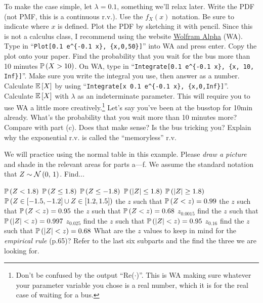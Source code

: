 \documentclass[12pt]{article}
\begin{document}
\benum
\easysubproblem To make the case simple, let $\lambda = 0.1$, something we'll relax later. Write the PDF (not PMF, this is a continuous r.v.). Use the $f_X(x)$ notation. Be sure to indicate where $x$ is defined.
\easysubproblem Plot the PDF by sketching it with pencil. Since this is not a calculus class, I recommend using the website \href{http://www.wolframalpha.com}{Wolfram Alpha} (WA). Type in ``\texttt{Plot[0.1 e\textasciicircum\{-0.1 x\}, \{x,0,50\}]}'' into WA and press enter. Copy the plot onto your paper.
\easysubproblem Find the probability that you wait for the bus more than 10 minutes \ie $\mathbb{P}\left(X>10\right)$. On WA, type in ``\texttt{Integrate[0.1 e\textasciicircum\{-0.1 x\}, \{x, 10, Inf\}]}''. Make sure you write the integral you use, then answer as a number.
\easysubproblem Calculate $\mathbb{E}\left[X\right]$ by using ``\texttt{Integrate[x 0.1 e\textasciicircum\{-0.1 x\}, \{x,0,Inf\}]}''.
\intermediatesubproblem Calculate $\mathbb{E}\left[X\right]$ with $\lambda$ as an indeterminate parameter. This will require you to use WA a little more creatively.\footnote{Don't be confused by the output ``Re($\cdot$)''. This is WA making sure whatever your parameter variable you chose is a real number, which it is for the real case of waiting for a bus.}
\extracreditsubproblem Let's say you've been at the busstop for 10min already. What's the probability that you wait more than 10 minutes more? Compare with part (c). Does that make sense? Is the bus tricking you? Explain why the exponential r.v. is called the ``memoryless'' r.v.
\eenum

\problem We will practice using the normal table in this example. Please \textit{draw a picture} and shade in the relevant areas for parts a---f. We assume the standard notation that $Z \sim \mathcal{N}\left(0,\,1\right)$. Find...

\benum
\easysubproblem $\mathbb{P}\left(Z < 1.8\right)$
\easysubproblem $\mathbb{P}\left(Z \leq 1.8\right)$
\easysubproblem $\mathbb{P}\left(Z \leq -1.8\right)$
\easysubproblem $\mathbb{P}\left(|Z| \leq 1.8\right)$
\easysubproblem $\mathbb{P}\left(|Z| \geq 1.8\right)$
\hardsubproblem $\mathbb{P}\left(Z \in [-1.5, -1.2] \cup Z \in [1.2,1.5]\right)$
\easysubproblem the $z$ such that $\mathbb{P}\left(Z < z\right) = 0.99$
\easysubproblem the $z$ such that $\mathbb{P}\left(Z < z\right) = 0.95$
\easysubproblem the $z$ such that $\mathbb{P}\left(Z < z\right) = 0.68$
\easysubproblem $z_{0.0015}$ \ie find the $z$ such that $\mathbb{P}\left(|Z| < z\right) = 0.997$
\easysubproblem $z_{0.025}$ \ie find the $z$ such that $\mathbb{P}\left(|Z| < z\right) = 0.95$
\easysubproblem $z_{0.16}$ \ie find the $z$ such that $\mathbb{P}\left(|Z| < z\right) = 0.68$
\easysubproblem What are the $z$ values to keep in mind for the \textit{empirical rule} (p.65)? Refer to the last six subparts and the find the three we are looking for.
\eenum
\end{document}
